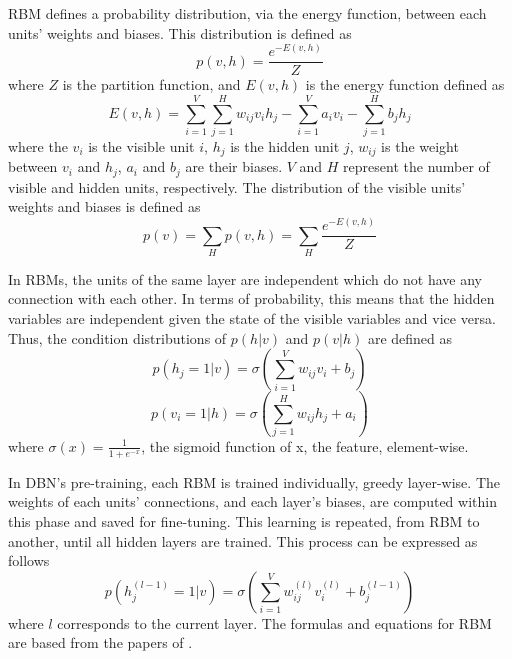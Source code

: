 RBM defines a probability distribution, via the energy function, between each units’ weights and biases. This distribution is defined as
\begin{equation} \label{eq:1}
p(v, h) = \frac{e^{-E(v, h)}}{Z}
\end{equation}
\noindent where $Z$ is the partition function, and  $E(v, h)$ is the energy function defined as 
\begin{equation}\label{eq:2}
E(v, h) = \sum^V_{i=1} \sum^H_{j=1}  w_{ij} v_i h_j - \sum^V_{i=1}a_iv_i - \sum^H_{j=1}b_jh_j
\end{equation}
\noindent where the $v_i$ is the visible unit $i$, $h_j$ is the hidden unit $j$, $w_{ij}$ is the weight between $v_i$ and $h_j$, $a_i$ and $b_j$ are their biases. $V$ and $H$ represent the number of visible and hidden units, respectively. 
The distribution of the visible units’ weights and biases is defined as 
\begin{equation}\label{eq:3}
p(v) = \sum_H p(v, h) = \sum_H \frac{e ^ {-E(v, h)}}{Z}
\end{equation}

In RBMs, the units of the same layer are independent which do not have any connection with each other. In terms of probability, this means that the hidden variables are independent given the state of the visible variables and vice versa. Thus, the condition distributions of $p(h|v)$ and $p(v|h)$ are defined as
\begin{equation}\label{eq:4}
p(h_j = 1 | v) = \sigma\left( \sum^V_{i=1} w_{ij}v_i + b_j \right)
\end{equation}
\begin{equation}\label{eq:5}
p(v_i = 1 | h) = \sigma\left( \sum^H_{j=1} w_{ij}h_j + a_i \right)
\end{equation}
\noindent where $\sigma(x) = \frac{1}{1 + e^{-x}}$, the sigmoid function of x, the feature, element-wise.

In DBN’s pre-training, each RBM is trained individually, greedy layer-wise. The weights of each units’ connections, and each layer’s biases, are computed within this phase and saved for fine-tuning. This learning is repeated, from RBM to another, until all hidden layers are trained. This process can be expressed as follows 
\begin{equation}\label{eq:6}
p(h_j^{(l-1)} = 1 | v) = \sigma( \sum^V_{i=1} w_{ij}^{(l)}v_i^{(l)} + b_j^{(l-1)} )
\end{equation}
\noindent where $l$ corresponds to the current layer. 
The formulas and equations for RBM are based from the papers of . 




